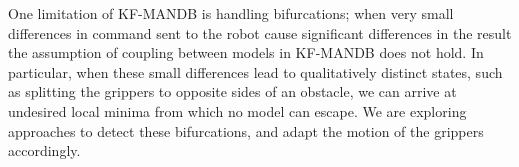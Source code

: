 One limitation of KF-MANDB is handling bifurcations; when very small differences in command sent to the robot cause significant differences in the result the assumption of coupling between models in KF-MANDB does not hold. In particular, when these small differences lead to qualitatively distinct states, such as splitting the grippers to opposite sides of an obstacle, we can arrive at undesired local minima from which no model can escape. We are exploring approaches to detect these bifurcations, and  adapt the motion of the grippers accordingly.